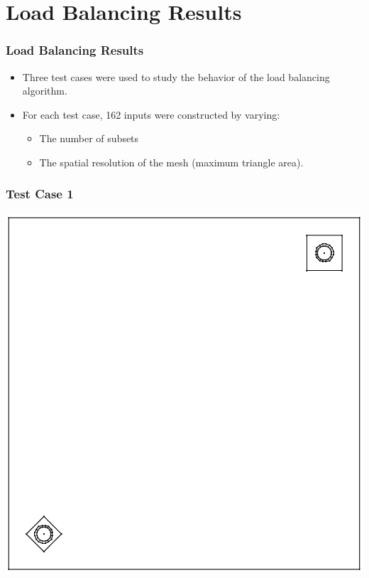 \documentclass[compress]{beamer}
\begin{document}
\section{Load Balancing Results}
\begin{frame}[t]\frametitle{Load Balancing Results}
\begin{block}{}
\begin{itemize}
	\item Three test cases were used to study the behavior of the load balancing algorithm.
	\item For each test case, 162 inputs were constructed by varying:
		\begin{itemize}
		\item The number of subsets
		\item The spatial resolution of the mesh (maximum triangle area).
		\end{itemize}
\end{itemize}
\end{block}
\end{frame}

\begin{frame}[t]\frametitle{Test Case 1}
\centering
\includegraphics[scale = 0.4]{figures/unbalanced_lattice-eps-converted-to.pdf}
\end{frame}
\end{document}
